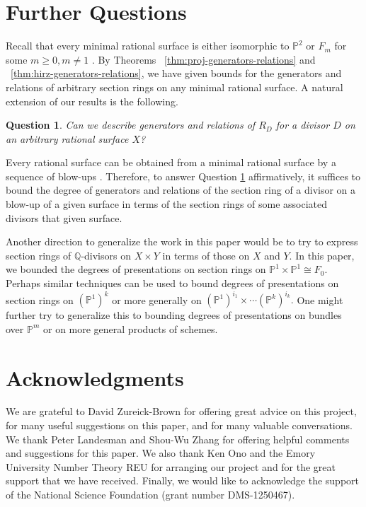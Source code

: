 \documentclass{amsart}
\theoremstyle{plain}
\newtheorem{question}[thm]{Question}
\theoremstyle{definition}
\theoremstyle{remark}
\numberwithin{equation}{section}
\newcommand\bq{{\mathbb Q}}
\newcommand\bp{{\mathbb P}}
\newcommand\hirz{F}
\newcommand\invisiblesubsection{%
  \refstepcounter{subsection}%
}
\begin{document}

\section{Further Questions}
\label{sec:conc}
\invisiblesubsection
Recall that every minimal rational surface is either isomorphic to
$\bp^2$ or $\hirz_m$ for some $m \geq 0, m \neq 1$ \cite{eisenbud-harris:minimal}. By Theorems
~\ref{thm:proj-generators-relations} and ~\ref{thm:hirz-generators-relations}, we have given bounds for the generators and relations
of arbitrary section rings on any minimal rational surface. A
natural extension of our results is the following.
\begin{question}
\label{qn:general-minimal-surface}
Can we describe generators and relations of $R_D$ for a divisor $D$ on an
arbitrary rational surface $X$?
\end{question}

Every rational surface can be obtained from a minimal rational surface by a 
sequence of blow-ups \cite{eisenbud-harris:minimal}. Therefore, to answer
Question \ref{qn:general-minimal-surface} affirmatively, it suffices
to bound the degree of generators and relations of the 
section ring of a divisor on a blow-up of a given surface
in terms of the section 
rings of some associated divisors that given surface.

Another direction to generalize the work in this paper
would be to try to express section rings of $\bq$-divisors on
$X \times Y$ in terms of those on $X$ and $Y$. In this paper,
we bounded the degrees of presentations on section rings on $\bp^1 \times \bp^1 \cong \hirz_0$.
Perhaps similar techniques can be used to bound
degrees of presentations on section rings on $(\bp^1)^k$ or
more generally on $(\bp^1)^{i_1} \times \cdots (\bp^k)^{i_k}.$
One might further try to generalize this to bounding degrees of presentations on bundles over $\bp^m$ or on more general
products of schemes.


\section{Acknowledgments}
\label{sec:ack}
We are grateful to David Zureick-Brown for offering great advice on
this project, for many useful suggestions on this paper, and for
many valuable conversations. We thank Peter
Landesman and Shou-Wu Zhang for offering helpful comments and
suggestions for this paper. We also thank Ken Ono and the
Emory University Number Theory REU for arranging our project and
for the great support that we have received. Finally, we would like to acknowledge the
support of the National Science Foundation (grant number DMS-1250467).


\nocite{*}


\end{document}
